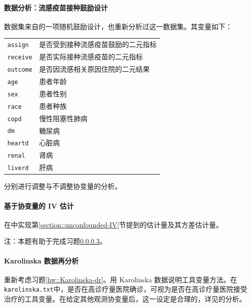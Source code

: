 \paragraph{数据分析：流感疫苗接种鼓励设计\citep{mcdonald1992effects}}\label{problem::flushot}
 

数据集来自\citet{mcdonald1992effects}的一项随机鼓励设计，\citet{hirano2000assessing}也重新分析过这一数据集。其变量如下：

\begin{tabular}{ll}
\hline 
\texttt{assign} & 是否受到接种流感疫苗鼓励的二元指标\\
\texttt{receive} & 是否实际接种流感疫苗的二元指标 \\
\texttt{outcome} & 是否因流感相关原因住院的二元结果\\
\texttt{age} & 患者年龄\\
\texttt{sex} & 患者性别\\
\texttt{race} & 患者种族\\
\texttt{copd} &  慢性阻塞性肺病\\
\texttt{dm} & 糖尿病\\
\texttt{heartd} & 心脏病\\
\texttt{renal} & 肾病\\
\texttt{liverd} & 肝病\\
\hline 
\end{tabular}


分别进行调整与不调整协变量的分析。
 


\paragraph{基于协变量的 IV 估计}\label{hw::iv-conditional-x}

在中实现第\ref{section::unconfounded-IV}节提到的估计量及其方差估计量。 

注：本题有助于完成习题\ref{hw::analyze-karolinska-iv}。 



\paragraph{Karolinska 数据再分析}\label{hw::analyze-karolinska-iv}

重新考虑习题\ref{hw::Karolinska-dr}。\citet{rubin2008objective}用 Karolinska 数据说明工具变量方法。在\texttt{karolinska.txt}中，是否在高诊疗量医院确诊，可视为是否在高诊疗量医院接受治疗的工具变量。在给定其他观测协变量后，这一设定是合理的，详见\citet{rubin2008objective}的分析。 


